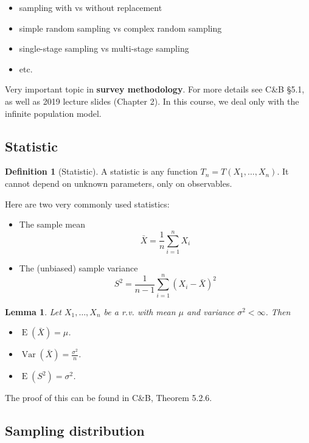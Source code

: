 \documentclass[
]{book}
\providecommand{\tightlist}{%
  \setlength{\itemsep}{0pt}\setlength{\parskip}{0pt}}
\DeclareMathOperator{\E}{E}
\DeclareMathOperator{\Var}{Var}
\newtheorem{lemma}{Lemma}[chapter]
\theoremstyle{definition}
\newtheorem{definition}{Definition}[chapter]
\theoremstyle{definition}
\theoremstyle{definition}
\theoremstyle{definition}
\theoremstyle{remark}
\begin{document}
\begin{itemize}
\tightlist
\item
  sampling with vs without replacement
\item
  simple random sampling vs complex random sampling
\item
  single-stage sampling vs multi-stage sampling
\item
  etc.
\end{itemize}

Very important topic in \textbf{survey methodology}.
For more details see C\&B §5.1, as well as 2019 lecture slides (Chapter 2).
In this course, we deal only with the infinite population model.

\hypertarget{statistic}{%
\subsection{Statistic}\label{statistic}}

\begin{definition}[Statistic]
A statistic is any function \(T_n = T(X_1,\dots,X_n)\). It cannot depend on unknown parameters, only on observables.
\end{definition}

Here are two very commonly used statistics:

\begin{itemize}
\item
  The sample mean
  \[
  \bar X = \frac{1}{n}\sum_{i=1}^n X_i
  \]
\item
  The (unbiased) sample variance
  \[
  S^2 = \frac{1}{n-1}\sum_{i=1}^n (X_i-\bar X)^2
  \]
\end{itemize}

\begin{lemma}

Let \(X_1,\dots,X_n\) be a r.v. with mean \(\mu\) and variance \(\sigma^2<\infty\). Then

\begin{itemize}
\tightlist
\item
  \(\E(\bar X) = \mu\).
\item
  \(\Var(\bar X) = \frac{\sigma^2}{n}\).
\item
  \(\E(S^2)=\sigma^2\).
\end{itemize}

\end{lemma}

The proof of this can be found in C\&B, Theorem 5.2.6.

\hypertarget{sampling-distribution}{%
\subsection{Sampling distribution}\label{sampling-distribution}}
\end{document}
